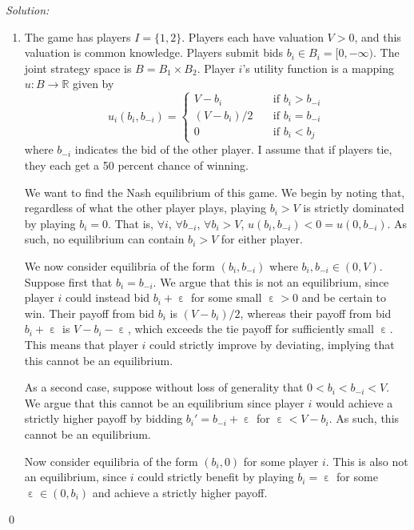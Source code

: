 \documentclass[12pt]{article}
\DeclareMathOperator{\eps}{\varepsilon}
\newenvironment{sol}
    {\emph{Solution:}
    }
    {
    \qed
    }
\begin{document}
\begin{sol}
\begin{enumerate}[label=\alph*) ]
    \item The game has players $I = \{1, 2\}$. Players each have valuation $V > 0$, and this valuation is common knowledge. Players submit bids $b_i \in B_i = [0, -\infty)$. The joint strategy space is $B = B_1 \times B_2$. Player $i$'s utility function is a mapping $u : B \rightarrow \mathbb{R}$ given by
    \[u_i(b_i, b_{-i})= \begin{cases} V - b_i \quad&\text{if } b_i > b_{-i}\\
        (V - b_i)/2 \quad&\text{if } b_i = b_{-i}\\
        0 \quad&\text{if } b_i < b_j
    \end{cases}\]
    where $b_{-i}$ indicates the bid of the other player. I assume that if players tie, they each get a 50 percent chance of winning.

    We want to find the Nash equilibrium of this game. We begin by noting that, regardless of what the other player plays, playing $b_i > V$ is strictly dominated by playing $b_i = 0$. That is, $\forall i$, $\forall b_{-i}$, $\forall b_i > V$, $u(b_i, b_{-i}) < 0 = u(0, b_{-i})$. As such, no equilibrium can contain $b_i > V$ for either player.

    We now consider equilibria of the form $(b_i, b_{-i})$ where $b_i, b_{-i} \in (0, V)$. Suppose first that $b_i = b_{-i}$. We argue that this is not an equilibrium, since player $i$ could instead bid $b_i + \eps$ for some small $\eps > 0$ and be certain to win. Their payoff from bid $b_i$ is $(V - b_i)/2$, whereas their payoff from bid $b_i + \eps$ is $V - b_i - \eps$, which exceeds the tie payoff for sufficiently small $\eps$. This means that player $i$ could strictly improve by deviating, implying that this cannot be an equilibrium.

    As a second case, suppose without loss of generality that $0 < b_i < b_{-i} < V$. We argue that this cannot be an equilibrium since player $i$ would achieve a strictly higher payoff by bidding $b_i' = b_{-i} + \eps$ for $\eps < V - b_{i}$. As such, this cannot be an equilibrium.

    Now consider equilibria of the form $(b_i, 0)$ for some player $i$. This is also not an equilibrium, since $i$ could strictly benefit by playing $b_i = \eps$ for some $\eps \in (0,b_i)$ and achieve a strictly higher payoff.


\end{enumerate}
\end{sol}
\end{document}
